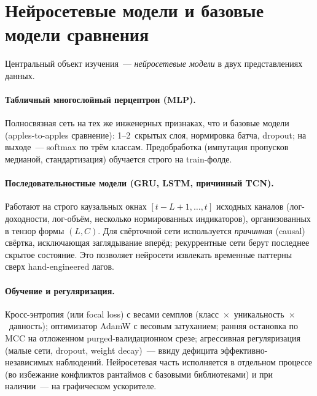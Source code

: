 \documentclass[12pt,a4paper]{report}
\begin{document}
\section{Нейросетевые модели и базовые модели сравнения}
\label{sec:nn}

Центральный объект изучения~--- \emph{нейросетевые модели} в двух представлениях
данных.

\paragraph{Табличный многослойный перцептрон (MLP).} Полносвязная сеть на тех же
инженерных признаках, что и базовые модели (apples-to-apples сравнение):
1--2~скрытых слоя, нормировка батча, dropout; на выходе~--- softmax по трём классам.
Предобработка (импутация пропусков медианой, стандартизация) обучается строго на
train-фолде.

\paragraph{Последовательностные модели (GRU, LSTM, причинный TCN).} Работают на
строго каузальных окнах $[t-L+1,\dots,t]$ исходных каналов (лог-доходности,
лог-объём, несколько нормированных индикаторов), организованных в тензор формы
$(L,C)$. Для свёрточной сети используется \emph{причинная} (causal) свёртка,
исключающая заглядывание вперёд; рекуррентные сети берут последнее скрытое
состояние. Это позволяет нейросети извлекать временные паттерны сверх
hand-engineered лагов.

\paragraph{Обучение и регуляризация.} Кросс-энтропия (или focal loss) с весами
семплов (класс~$\times$~уникальность~$\times$~давность); оптимизатор AdamW с
весовым затуханием; ранняя остановка по MCC на отложенном purged-валидационном
срезе; агрессивная регуляризация (малые сети, dropout, weight decay)~--- ввиду
дефицита эффективно-независимых наблюдений. Нейросетевая часть исполняется в
отдельном процессе (во избежание конфликтов рантаймов с базовыми библиотеками) и при
наличии~--- на графическом ускорителе.
\end{document}
